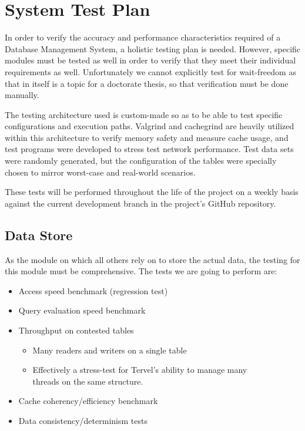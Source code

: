 \documentclass[letterpaper, 12pt]{article}
\begin{document}
\section{System Test Plan}
In order to verify the accuracy and performance characteristics required of a Database Management System,
a holistic testing plan is needed. However, specific modules must be tested as well in order to 
verify that they meet their individual requirements as well. Unfortunately we cannot explicitly test
for wait-freedom as that in itself is a topic for a doctorate thesis, so that verification must
be done manually.
\par\vspace{\baselineskip}
The testing architecture used is custom-made so as to be able to test specific configurations and 
execution paths. Valgrind and cachegrind are heavily utilized within this architecture  to verify 
memory safety and measure cache usage, and test programs were developed to stress test network 
performance. Test data sets were randomly generated, but the configuration of the tables were
specially chosen to mirror worst-case and real-world scenarios.
\par\vspace{\baselineskip}
These tests will be performed throughout the life of the project on a weekly basis against the current
development branch in the project's GitHub repository. 

\subsection{Data Store}
As the module on which all others rely on to store the actual data, the testing for this
module must be comprehensive. The tests we are going to perform are:
\begin{itemize}
 \item Access speed benchmark (regression test)
 \item Query evaluation speed benchmark
 \item Throughput on contested tables
 \begin{itemize}
  \item Many readers and writers on a single table
  \item Effectively a stress-test for Tervel's ability to manage many \\ threads on the same
	structure.
 \end{itemize}
 \item Cache coherency/efficiency benchmark 
 \item Data consistency/determinism tests
\end{itemize}
\end{document}
